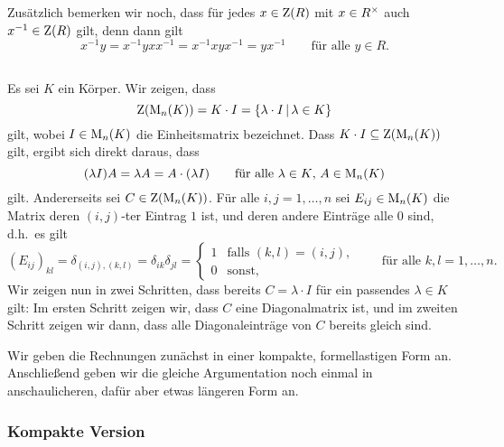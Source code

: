 Zusätzlich bemerken wir noch, dass für jedes $x \in \operatorname{Z}(R)$ mit $x \in {R}^\times$ auch $x^{-1} \in \operatorname{Z}(R)$ gilt, denn dann gilt
\[
    x^{-1} y
  = x^{-1} y x x^{-1}
  = x^{-1} x y x^{-1}
  = y x^{-1}
  \qquad
  \text{für alle $y \in R$}.
\]





\subsection{}
Es sei $K$ ein Körper.
Wir zeigen, dass
\[
    \operatorname{Z}(\operatorname{M}_{n}(K))
  = K \cdot I
  = \{\lambda \cdot I \,|\, \lambda \in K\}
\]
gilt, wobei $I \in \operatorname{M}_{n}(K)$ die Einheitsmatrix bezeichnet.
Dass $K \cdot I \subseteq \operatorname{Z}(\operatorname{M}_{n}(K))$ gilt, ergibt sich direkt daraus, dass
\[
    (\lambda I) A
  = \lambda A
  = A \cdot (\lambda I)
  \qquad
  \text{für alle $\lambda \in K$, $A \in \operatorname{M}_{n}(K)$}
\]
gilt.
Andererseits sei $C \in \operatorname{Z}(\operatorname{M}_{n}(K))$.
Für alle $i,j = 1, \dotsc, n$ sei $E_{ij} \in \operatorname{M}_{n}(K)$ die Matrix deren $(i,j)$-ter Eintrag $1$ ist, und deren andere Einträge alle $0$ sind, d.h.\ es gilt
\[
    (E_{ij})_{kl}
  = \delta_{(i,j), (k,l)}
  = \delta_{ik} \delta_{jl}
  = \begin{cases}
      1 & \text{falls $(k,l) = (i,j)$}, \\
      0 & \text{sonst},
    \end{cases}
    \qquad
    \text{für alle $k,l = 1, \dotsc, n$}.
\]
Wir zeigen nun in zwei Schritten, dass bereits $C = \lambda \cdot I$ für ein passendes $\lambda \in K$ gilt:
Im ersten Schritt zeigen wir, dass $C$ eine Diagonalmatrix ist, und im zweiten Schritt zeigen wir dann, dass alle Diagonaleinträge von $C$ bereits gleich sind.

Wir geben die Rechnungen zunächst in einer kompakte, formellastigen Form an.
Anschließend geben wir die gleiche Argumentation noch einmal in anschaulicheren, dafür aber etwas längeren Form an.



\subsubsection{Kompakte Version}


